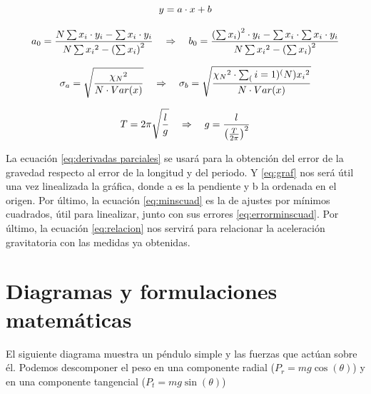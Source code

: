 \documentclass{article}
\begin{document}
\begin{equation}\label{eq:graf}
    \centering
    y = a\cdot{x} + b
\end{equation}

\vspace{0.3cm}

\begin{equation}\label{eq:minscuad}
    \centering
    a_0 = \frac{N\sum x_i\cdot{y_i} - \sum x_i\cdot{y_i}}{N\sum {x_i}^2 - \left(\sum x_i \right)^2} \quad \Rightarrow \quad
    b_0 = \frac{\left(\sum x_i \right)^2\cdot{y_i} - \sum x_i\cdot\sum x_i\cdot{y_i}}{N\sum {x_i}^2 - \left(\sum x_i \right)^2}
\end{equation}

\vspace{0.3cm}

\begin{equation}\label{eq:errorminscuad}
    \centering
    \sigma_a = \sqrt{\frac{{\chi_N}^2}{N\cdot{Var(x)}}}
    \quad \Rightarrow \quad
    \sigma_b = \sqrt{\frac{{\chi_N}^2\cdot{\sum_(i=1)^(N) {x_i}^2}}{N\cdot{Var(x)}}}
\end{equation}

\begin{equation}\label{eq:relacion}
    \centering
    T = 2\pi \sqrt{\frac{l}{g}} \quad \Rightarrow \quad g = \frac{l}{\left( \frac{T}{2\pi}\right)^2}
\end{equation}

\vspace{0.3cm}

La ecuación \eqref{eq:derivadas parciales} se usará para la obtención del error de la gravedad respecto al error de la longitud y del periodo. Y \eqref{eq:graf} nos será útil una vez linealizada la gráfica, donde a es la pendiente y b la ordenada en el origen. Por último, la ecuación \eqref{eq:minscuad} es la de ajustes por mínimos cuadrados, útil para linealizar, junto con sus errores \eqref{eq:errorminscuad}. Por último, la ecuación \eqref{eq:relacion} nos servirá para relacionar la aceleración gravitatoria con las medidas ya obtenidas.

\section{Diagramas y formulaciones matemáticas}

El siguiente diagrama muestra un péndulo simple y las fuerzas que actúan sobre él. Podemos descomponer el peso en una componente radial ($P_{r} = m g \cos(\theta) $) y en una componente tangencial ($P_{t} = m g \sin(\theta) $)
\end{document}
